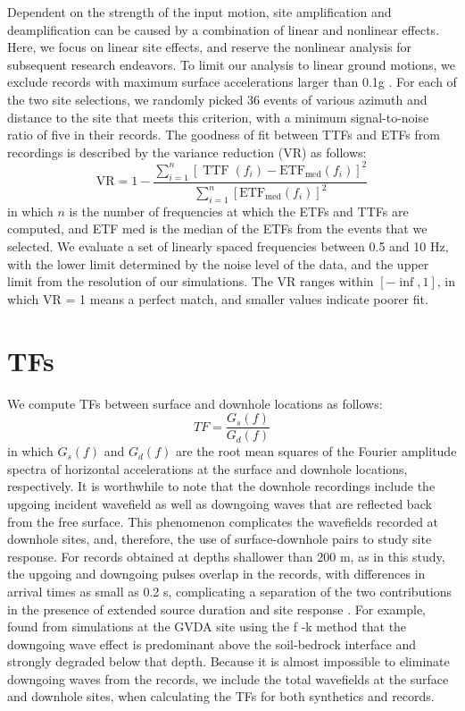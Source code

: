 Dependent on the strength of the input motion, site amplification and deamplification can be caused by a combination of linear and nonlinear effects. Here, we focus on linear site effects, and reserve the nonlinear analysis for subsequent research endeavors. To limit our analysis to linear ground motions, we exclude records with maximum surface accelerations larger than 0.1g . For each of the two site selections, we randomly picked 36 events of various azimuth and distance to the site that meets this criterion, with a minimum signal-to-noise ratio of five in their records. The goodness of fit between TTFs and ETFs from recordings is described by the variance reduction (VR) as follows:
\begin{equation}\label{eq:etf-1}
  \mathrm{VR}=1-\frac{\sum_{i=1}^{n}\left[\operatorname{TTF}\left(f_{i}\right)-\mathrm{ETF}_{\mathrm{med}}\left(f_{i}\right)\right]^{2}}{\sum_{i=1}^{n}\left[\mathrm{ETF}_{\mathrm{med}}\left(f_{i}\right)\right]^{2}}
\end{equation}
\noindent in which $n$ is the number of frequencies at which the ETFs and TTFs are computed, and ETF med is the median of the ETFs from the events that we selected. We evaluate a set of linearly spaced frequencies between 0.5 and 10 Hz, with the lower limit determined by the noise level of the data, and the upper limit from the resolution of our simulations. The VR ranges within $[-\inf, 1]$, in which VR = 1 means a perfect match, and smaller values indicate poorer fit.


\section{TFs}\label{etf:tfs}
We compute TFs between surface and downhole locations as follows:
\begin{equation}\label{eq:etf-2}
  TF = \frac{G_s(f)}{G_d(f)}
\end{equation}
\noindent in which $G_s(f)$ and $G_d(f)$ are the root mean squares of the Fourier amplitude spectra of horizontal accelerations at the surface and downhole locations, respectively. It is worthwhile to note that the downhole recordings include the upgoing incident wavefield as well as downgoing waves that are reflected back from the free surface. This phenomenon complicates the wavefields recorded at downhole sites, and, therefore, the use of surface-downhole pairs to study site response. For records obtained at depths shallower than 200 m, as in this study, the upgoing and downgoing pulses overlap in the records, with differences in arrival times as small as 0.2 s, complicating a separation of the two contributions in the presence of extended source duration and site response \citep{shearerSurfaceNearsurfaceEffects1987}. For example, \citet{bonillaBoreholeResponseStudies2002}  found from simulations at the GVDA site using the f -k method that the downgoing wave effect is predominant above the soil-bedrock interface and strongly degraded below that depth. Because it is almost impossible to eliminate downgoing waves from the records, we include the total wavefields at the surface and downhole sites, when calculating the TFs for both synthetics and records.

